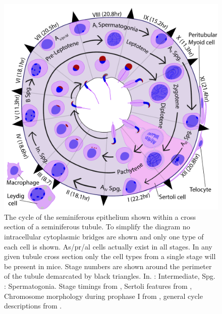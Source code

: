 \begin{figure}[H]
	\centering
	\includegraphics[width=\textwidth]{figures/intro/testis_cycle_anatomy.pdf}
	\caption[Testis Anatomy]{The cycle of the seminiferous epithelium shown within a cross section of a seminiferous tubule. To simplify the diagram no intracellular cytoplasmic bridges are shown and only one type of each cell is shown. As/pr/al cells actually exist in all stages. In any given tubule cross section only the cell types from a single stage will be present in mice. Stage numbers are shown around the perimeter of the tubule demarcated by black triangles. In. : Intermediate, Spg. : Spermatogonia. Stage timings from \cite{Oakberg1956Duration}, Sertoli features from \cite{Hess2015Sertoli}, Chromosome morphology during prophase I from \cite{Link2019Meiotic}, general cycle descriptions from \cite{Monesi1978Chapter, Ahmed2009Staging, Meistrich2013Assessment, Oakberg1956description, Hess2008Spermatogenesis, Nakata2015Quantitative, Muciaccia2013Novel, Osuru2014acrosomal, Lara2018Testis, Junqueira2005Basic}.}
	\label{fig:histology}
\end{figure}

